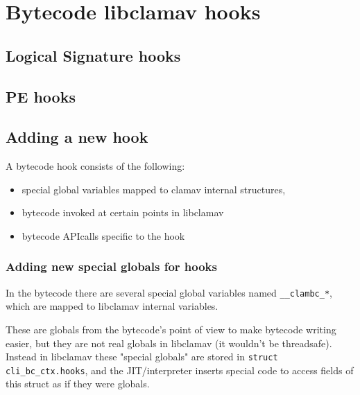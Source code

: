 \chapter{Bytecode libclamav hooks}
\section{Logical Signature hooks}
\section{PE hooks}

\section{Adding a new hook}
A bytecode hook consists of the following:
\begin{itemize}
\item special global variables mapped to clamav internal structures,
\item bytecode invoked at certain points in libclamav
\item bytecode APIcalls specific to the hook
\end{itemize}

\subsection{Adding new special globals for hooks}
In the bytecode there are several special global variables named
\verb+__clambc_*+, which are mapped to libclamav internal variables.

These are globals from the bytecode's point of view to make bytecode writing
easier, but they are not real globals in libclamav (it wouldn't be threadsafe).
Instead in libclamav these "special globals" are stored in \verb+struct cli_bc_ctx.hooks+,
and the JIT/interpreter inserts special code to access fields of this struct as
if they were globals.

